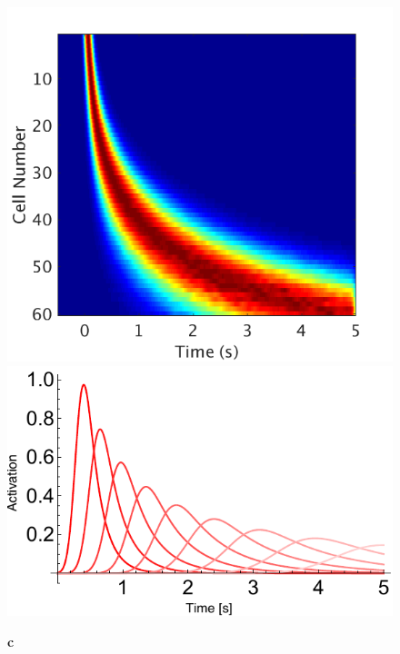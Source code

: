 \documentclass{apa}
\begin{document}
\begin{figure}
\begin{minipage}{.25\linewidth}
		\includegraphics[width=.99\linewidth]{figs/HeatmapTimeCellsV2.png}
		\includegraphics[width=.99\linewidth]{figs/TimeCellParams.pdf}
	\end{minipage}
	\begin{minipage}{0.5\linewidth}
		\textbf{c}
		\begin{center}

\end{center}
\end{minipage}
\end{figure}
\end{document}
